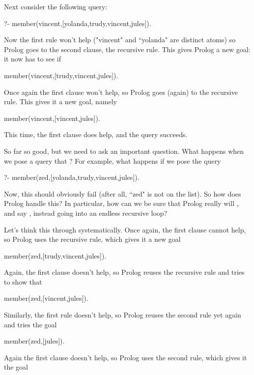 Next consider the following query:

\begin{LPNcodedisplay}
?- member(vincent,[yolanda,trudy,vincent,jules]).
\end{LPNcodedisplay}
Now the first rule won't help ("vincent" and ``yolanda" are
distinct atoms) so Prolog goes to the second clause, the recursive
rule. This gives Prolog a new goal: it now has to see if

\begin{LPNcodedisplay}
member(vincent,[trudy,vincent,jules]).
\end{LPNcodedisplay}
Once again the first clause won't help, so Prolog goes (again) to
the recursive rule. This gives it a new goal, namely

\begin{LPNcodedisplay}
member(vincent,[vincent,jules]).
\end{LPNcodedisplay}
This time, the first clause does help, and the query succeeds.

So far so good, but we need to ask an important question.  What
happens when we pose a query that ?  For example, what
happens if we pose the query

\begin{LPNcodedisplay}
?- member(zed,[yolanda,trudy,vincent,jules]).
\end{LPNcodedisplay}


Now, this should obviously fail (after all, ``zed" is not on the
list).  So how does Prolog handle this?  In particular, how can we be
sure that Prolog really will , and say , instead
going into an endless recursive loop?

Let's think this through systematically.  Once again, the first clause
cannot help, so Prolog uses the recursive rule, which gives it a new
goal

\begin{LPNcodedisplay}
member(zed,[trudy,vincent,jules]).
\end{LPNcodedisplay}
Again, the first clause doesn't help, so Prolog reuses the recursive
rule and tries to show that

\begin{LPNcodedisplay}
member(zed,[vincent,jules]).
\end{LPNcodedisplay}
Similarly, the first rule doesn't help, so Prolog reuses the second
rule yet again and tries the goal
\begin{LPNcodedisplay}
member(zed,[jules]).
\end{LPNcodedisplay}
Again the first clause doesn't help, so Prolog uses the second rule,
which gives it the goal

